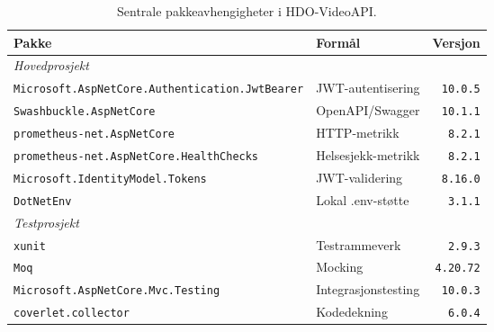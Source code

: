 \begin{table}[htbp]
\centering
\caption{Sentrale pakkeavhengigheter i HDO-VideoAPI.}
\label{tab:avhengigheter}
\begin{tabular}{llr}
\toprule
\textbf{Pakke} & \textbf{Formål} & \textbf{Versjon} \\
\midrule
\multicolumn{3}{l}{\textit{Hovedprosjekt}} \\
\texttt{Microsoft.AspNetCore.Authentication.JwtBearer} & JWT-autentisering   & \texttt{10.0.5}  \\
\texttt{Swashbuckle.AspNetCore}                        & OpenAPI/Swagger     & \texttt{10.1.1}  \\
\texttt{prometheus-net.AspNetCore}                     & HTTP-metrikk        & \texttt{8.2.1}   \\
\texttt{prometheus-net.AspNetCore.HealthChecks}        & Helsesjekk-metrikk  & \texttt{8.2.1}   \\
\texttt{Microsoft.IdentityModel.Tokens}                & JWT-validering      & \texttt{8.16.0}  \\
\texttt{DotNetEnv}                                     & Lokal .env-støtte   & \texttt{3.1.1}   \\
\midrule
\multicolumn{3}{l}{\textit{Testprosjekt}} \\
\texttt{xunit}                                         & Testrammeverk       & \texttt{2.9.3}   \\
\texttt{Moq}                                           & Mocking             & \texttt{4.20.72} \\
\texttt{Microsoft.AspNetCore.Mvc.Testing}              & Integrasjonstesting & \texttt{10.0.3}  \\
\texttt{coverlet.collector}                            & Kodedekning         & \texttt{6.0.4}   \\
\bottomrule
\end{tabular}
\end{table}